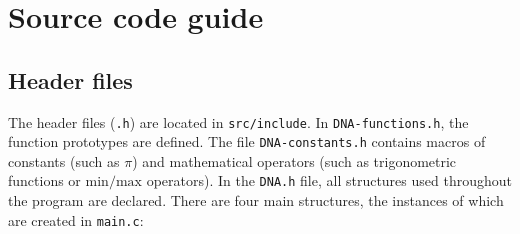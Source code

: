 \chapter{Source code guide}
\label{chap:Source code guide}

\section{Header files}
\label{sec:Header files}

The header files ({\tt *.h}) are located in {\tt src/include}. In {\tt DNA-functions.h}, the function prototypes are defined. The file {\tt DNA-constants.h} contains macros of constants (such as $\pi$) and mathematical operators (such as trigonometric functions or $\mathrm{min/max}$ operators). In the {\tt DNA.h} file, all structures used throughout the program are declared. There are four main structures, the instances of which are created in {\tt main.c}:


